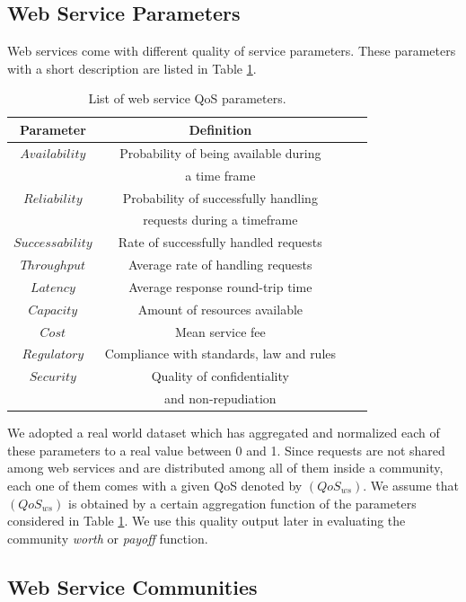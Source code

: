 \documentclass[10pt,journal,cspaper,compsoc]{IEEEtran}
\begin{document}
\subsection{Web Service Parameters}\label{ws_parameters}

Web services come with different quality of service parameters.
These parameters with a short description are listed in Table
\ref{qosws}.

\begin{table}[!t]
\centering
\caption{List of web service QoS parameters.}
\begin{tabular}{|c|c||c|c|}
\hline
\textbf{Parameter} & \textbf{Definition} \\
\hline\hline
$Availability$ & Probability of being available during \\
&a time frame \\
$Reliability$ & Probability of successfully handling \\
&requests during a timeframe\\
$Successability$ & Rate of successfully handled requests \\
$Throughput$ & Average rate of handling requests \\
$Latency$ & Average response round-trip time\\
$Capacity$ & Amount of resources available\\
$Cost$ & Mean service fee \\
$Regulatory$ & Compliance with standards, law and rules\\
$Security$ & Quality of confidentiality \\
&and non-repudiation\\
\hline
\end{tabular}
\label{qosws}
\end{table}

We adopted a real world dataset \cite{DBLP:conf/smc/Al-MasriM09a}
which has aggregated and normalized each of these parameters to a
real value between 0 and 1. Since requests are not shared among
web services and are distributed among all of them inside a
community, each one of them comes with a given QoS denoted by
$(QoS_{ws})$. We assume that $(QoS_{ws})$ is obtained by a certain
aggregation function of the parameters considered in Table
\ref{qosws}. We use this quality output later in evaluating the
community \emph{worth} or \emph{payoff} function.

\subsection{Web Service Communities}\label{webservice-communities}
\end{document}
